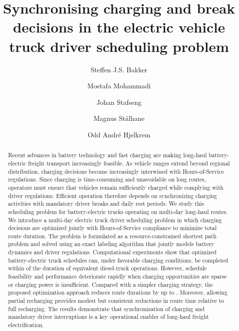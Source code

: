 \documentclass[3p,11pt,authoryear]{elsarticle}  %
\begin{document}

\begin{frontmatter}


\title{{Synchronising charging and break decisions in the electric vehicle truck driver scheduling problem}}

\author[indokaddress]{Steffen J.S. Bakker} 
            \author[indokaddress]{Mostafa Mohammadi}
            \author[indokaddress]{Johan Stafseng}
            \author[indokaddress]{Magnus Stålhane}
            \author[sintefaddress]{Odd André Hjelkrem}

		\address[indokaddress]{Department of Industrial Economics and Technology Management, Norwegian University of Science and Technology, Alfred Getz veg 3, NO-7491 Trondheim, Norway}
        \address[sintefaddress]{Department of Energy Systems, SINTEF Energy Research - Trondheim, Norway}


\begin{abstract}
Recent advances in battery technology and fast charging are making long-haul battery-electric freight transport increasingly feasible. As vehicle ranges extend beyond regional distribution, charging decisions become increasingly interwined with Hours-of-Service regulations. Since charging is time-consuming and unavoidable on long routes, operators must ensure that vehicles remain sufficiently charged while complying with driver regulations. Efficient operation therefore depends on synchronizing charging activities with mandatory driver breaks and daily rest periods.
%
We study this scheduling problem for battery-electric trucks operating on multi-day long-haul routes. We introduce a multi-day electric truck driver scheduling problem in which charging decisions are optimized jointly with Hours-of-Service compliance to minimize total route duration. 
The problem is formulated as a resource-constrained shortest path problem and solved using an exact labeling algorithm that jointly models battery dynamics and driver regulations.
Computational experiments show that optimized battery-electric truck schedules can, under favorable charging conditions, be completed within  of the duration of equivalent diesel-truck operations. However, schedule feasibility and performance deteriorate rapidly when charging opportunities are sparse or charging power is insufficient. 
Compared with a simpler charging strategy, the proposed optimization approach reduces route durations by up to . Moreover, allowing partial recharging provides modest but consistent reductions in route time relative to full recharging. The results demonstrate that synchronization of charging and mandatory driver interruptions is a key operational enabler of long-haul freight electrification.
\end{abstract}


\end{frontmatter}
\end{document}
